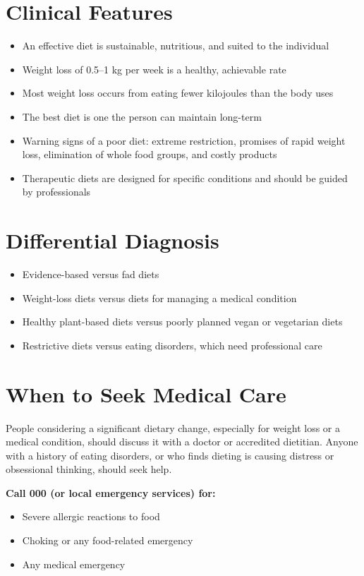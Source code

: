 \section*{Clinical Features}
\begin{itemize}
    \item An effective diet is sustainable, nutritious, and suited to the individual
    \item Weight loss of 0.5--1 kg per week is a healthy, achievable rate
    \item Most weight loss occurs from eating fewer kilojoules than the body uses
    \item The best diet is one the person can maintain long-term
    \item Warning signs of a poor diet: extreme restriction, promises of rapid weight loss, elimination of whole food groups, and costly products
    \item Therapeutic diets are designed for specific conditions and should be guided by professionals
\end{itemize}

\section*{Differential Diagnosis}
\begin{itemize}
    \item Evidence-based versus fad diets
    \item Weight-loss diets versus diets for managing a medical condition
    \item Healthy plant-based diets versus poorly planned vegan or vegetarian diets
    \item Restrictive diets versus eating disorders, which need professional care
\end{itemize}

\section*{When to Seek Medical Care}
People considering a significant dietary change, especially for weight loss or a medical condition, should discuss it with a doctor or accredited dietitian. Anyone with a history of eating disorders, or who finds dieting is causing distress or obsessional thinking, should seek help.

\textbf{Call 000 (or local emergency services) for:}
\begin{itemize}
    \item Severe allergic reactions to food
    \item Choking or any food-related emergency
    \item Any medical emergency
\end{itemize}

